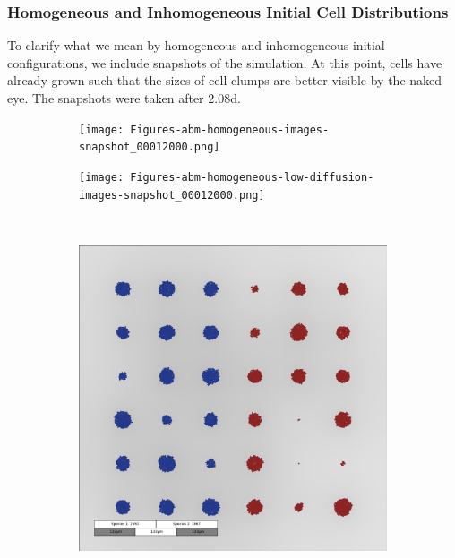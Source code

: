 \documentclass[10pt,twocolumn,5p]{elsarticle}
\numberwithin{equation}{section}
\begin{document}
\subsubsection{Homogeneous and Inhomogeneous Initial Cell Distributions}
To clarify what we mean by homogeneous and inhomogeneous initial configurations, we include snapshots of the simulation.
At this point, cells have already grown such that the sizes of cell-clumps are better visible by the naked eye.
The snapshots were taken after $2.08$\unit{\day}.
\begin{figure}
    \centering
    \begin{subfigure}[c]{0.5\textwidth}
        \texttt{[image: Figures-abm-homogeneous-images-snapshot\_00012000.png]}
    \end{subfigure}%
    \begin{subfigure}[c]{0.5\textwidth}
        \texttt{[image: Figures-abm-homogeneous-low-diffusion-images-snapshot\_00012000.png]}
    \end{subfigure}\\
    \begin{subfigure}[c]{0.5\textwidth}
        \includegraphics[width=\textwidth]{Figures-abm-inhomogenous-images-snapshot_00012000.png}%

\end{subfigure}
\end{figure}
\end{document}
